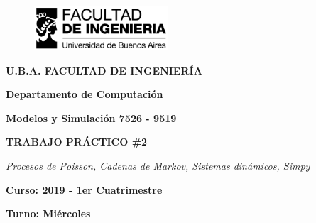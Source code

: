 \documentclass[11pt,a4paper]{article}
\author{cyn}
\begin{document}
\begin{titlepage}
\begin{center}
\vspace*{-1in}
\begin{figure}[htb]
\begin{flushleft}
\includegraphics[width=5cm]{imagenes/logo}
\end{flushleft}
\end{figure}
\begin{LARGE}
\textbf{U.B.A. FACULTAD DE INGENIERÍA}\\
\end{LARGE}
\vspace*{0.15in}
\begin{LARGE}
\textbf{Departamento de Computación}\\
\end{LARGE}
\vspace*{0.2in}
\begin{LARGE}
\textbf{Modelos y Simulación 7526 - 9519}\\
\end{LARGE}
\vspace*{0.2in}
\begin{Large}
\textbf{TRABAJO PRÁCTICO \#2}\\
\end{Large}
\vspace*{0.2in}
\begin{LARGE}
\textit{Procesos de Poisson, Cadenas de Markov, Sistemas dinámicos, Simpy }\\
\end{LARGE}
\vspace*{0.2in}
\begin{Large}
\raggedright\textbf{Curso: 2019 - 1er Cuatrimestre}\\
\end{Large}
\vspace*{0.1in}
\begin{Large}
\raggedright\textbf{Turno: Miércoles}\\
\end{Large}
\vspace*{0.1in}


\end{center}
\end{titlepage}
\end{document}
